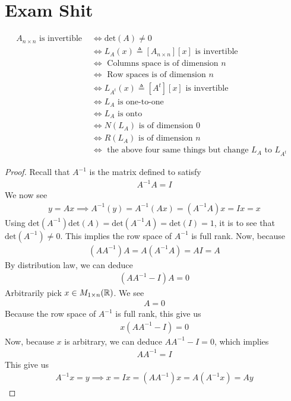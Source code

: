 \documentclass{report}
\begin{document}
\section{Exam Shit}
\begin{align*}
  A_{n\times n}\text{ is invertible }&\iff \text{det}(A)\neq 0\\
                                       &\iff L_A(x)\triangleq [A_{n\times n}][x]\text{ is invertible }\\
                                       &\iff \text{ Columns space is of dimension $n$ }\\
                                       &\iff \text{ Row spaces is of dimension $n$ }\\
                                       &\iff L_{A^t}(x)\triangleq [A^t][x]\text{ is invertible }\\
                                       &\iff L_A\text{ is one-to-one }\\
                                       &\iff L_A\text{ is onto }\\
                                       &\iff N(L_A)\text{ is of dimension $0$ }\\
                                       &\iff R(L_A)\text{ is of dimension $n$ }\\
                                       &\iff \text{ the above four same things  but change $L_A$ to  $L_{A^t}$ }
\end{align*}
\begin{proof}
Recall that $A^{-1}$ is the matrix defined to satisfy 
\begin{align*}
A^{-1}A= I
\end{align*}
We now see 
\begin{align*}
y=Ax \implies A^{-1}(y)=A^{-1}(Ax)=(A^{-1}A)x=Ix=x
\end{align*}
Using $\text{det}(A^{-1})\text{det}(A)=\text{det}(A^{-1}A)=\text{det}(I)=1$, it is to see that $\text{det}(A^{-1})\neq 0$. This implies the row space of $A^{-1}$ is full rank. Now, because 
\begin{align*}
  (AA^{-1})A= A(A^{-1}A)=AI=A
\end{align*}
By distribution law, we can deduce 
\begin{align*}
  (AA^{-1}-I)A=0
\end{align*}
Arbitrarily pick $x\in M_{1\times n}(\mathbb{R})$. We see 
\begin{align*}
  [x(AA^{-1}-I)]A=0
\end{align*}
Because the row space of $A^{-1}$ is full rank, this give us 
\begin{align*}
x(AA^{-1}-I)=0
\end{align*}
Now, because $x$ is arbitrary, we can deduce  $AA^{-1}-I=0$, which implies 
\begin{align*}
  AA^{-1}=I
\end{align*}
This give us 
\begin{align*}
A^{-1}x=y \implies x=Ix=(AA^{-1})x=A(A^{-1}x)=Ay\end{align*}
\end{proof}
\end{document}
